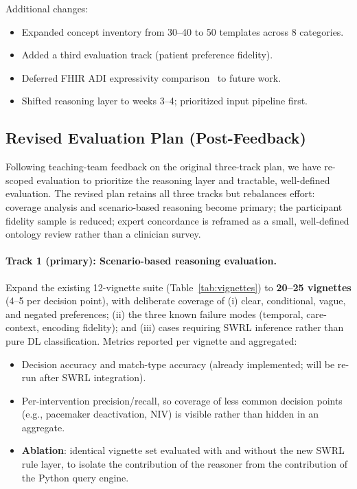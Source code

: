 \documentclass[11pt]{article}
\begin{document}
\noindent Additional changes:
\begin{itemize}[nosep]
    \item Expanded concept inventory from 30--40 to 50 templates across 8 categories.
    \item Added a third evaluation track (patient preference fidelity).
    \item Deferred FHIR ADI expressivity comparison~\cite{hl7adi2024} to future work.
    \item Shifted reasoning layer to weeks 3--4; prioritized input pipeline first.
\end{itemize}

\subsection{Revised Evaluation Plan (Post-Feedback)}
\label{sec:revised-eval}

Following teaching-team feedback on the original three-track plan, we have re-scoped evaluation to prioritize the reasoning layer and tractable, well-defined evaluation. The revised plan retains all three tracks but rebalances effort: coverage analysis and scenario-based reasoning become primary; the participant fidelity sample is reduced; expert concordance is reframed as a small, well-defined ontology review rather than a clinician survey.

\paragraph{Track 1 (primary): Scenario-based reasoning evaluation.}
Expand the existing 12-vignette suite (Table~\ref{tab:vignettes}) to \textbf{20--25 vignettes} (4--5 per decision point), with deliberate coverage of (i) clear, conditional, vague, and negated preferences; (ii) the three known failure modes (temporal, care-context, encoding fidelity); and (iii) cases requiring SWRL inference rather than pure DL classification. Metrics reported per vignette and aggregated:
\begin{itemize}[nosep]
    \item Decision accuracy and match-type accuracy (already implemented; will be re-run after SWRL integration).
    \item Per-intervention precision/recall, so coverage of less common decision points (e.g., pacemaker deactivation, NIV) is visible rather than hidden in an aggregate.
    \item \textbf{Ablation}: identical vignette set evaluated with and without the new SWRL rule layer, to isolate the contribution of the reasoner from the contribution of the Python query engine.
\end{itemize}
\end{document}
